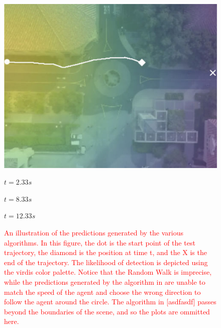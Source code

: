 \documentclass[letterpaper,10pt,conference]{ieeeconf}
\newcommand{\rtext}[1]{\textcolor{red}{#1}}
\begin{document}
\begin{figure}
\begin{minipage}[c]{0.3\linewidth}
		\includegraphics[width=\linewidth]{./figures/comparison/rand_death_1_2_t=370.jpg}
	\end{minipage}
	
	\vspace{0.2cm}
	\hspace{.5cm}
	\begin{minipage}{0.3\linewidth}
		\centering
		$t = 2.33s$
	\end{minipage}
	\begin{minipage}{0.3\linewidth}
		\centering
		$t = 8.33s$
	\end{minipage}
	\begin{minipage}{0.3\linewidth}
		\centering
		$t = 12.33s$
	\end{minipage}
	
	\caption{\rtext{An illustration of the predictions generated by the various algorithms. In this figure, the dot is the start point of the test trajectory, the diamond is the position at time t, and the X is the end of the trajectory. The likelihood of detection is depicted using the virdis color palette. Notice that the Random Walk is imprecise, while the predictions generated by the algorithm in \cite{Kitani2012} are unable to match the speed of the agent and choose the wrong direction to follow the agent around the circle. The algorithm in [asdfasdf] passes beyond the boundaries of the scene, and so the plots are ommitted here.}}
	
	\label{fig:death-1-2}
\end{figure}

  
\end{document}
